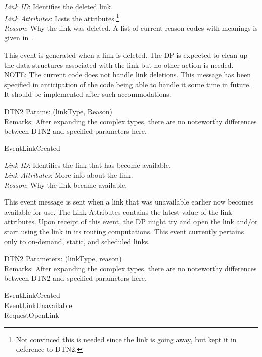 {
\metP
    {\em Link ID}: Identifies the deleted link.\\
    {\em Link Attributes}: Lists the attributes.\footnote{Not convinced this is
    needed since the link is going away, but kept it in deference to DTN2.}\\
    {\em Reason}: Why the link was deleted. A list of current reason codes 
    with meanings is given in~\cite{MITRE-IF}.

\metD
    This event is generated when a link is deleted. The DP is expected to
    clean up the data structures associated with the link but no other
    action is needed. NOTE: The current code does not handle link deletions.
    This message has been specified in anticipation of the code being able
    to  handle it some time in future. It should be implemented after such
    accommodations.

\metM
    DTN2 Params: (linkType, Reason)\\
    Remarks: After expanding the complex types, there are no noteworthy
    differences between DTN2 and specified parameters here. 

\metR
    EventLinkCreated
}

{
\metP
    {\em Link ID}: Identifies the link that has become available.\\
    {\em Link Attributes}: More info about the link.\\
    {\em Reason}: Why the link became available.

\metD
    This event message is sent when a link that was unavailable earlier
    now becomes available for use.  The Link Attributes contains the
    latest value of the link attributes. Upon
    receipt of this event, the DP might 
    try and open the link and/or start using the link in its routing
    computations. This event currently pertains only to on-demand,
    static, and scheduled links.

\metM
    DTN2 Parameters: (linkType, reason)\\
    Remarks: After expanding the complex types, there are no noteworthy
    differences between DTN2 and specified parameters here. 

\metR
    EventLinkCreated\\
    EventLinkUnavailable\\
    RequestOpenLink

}

